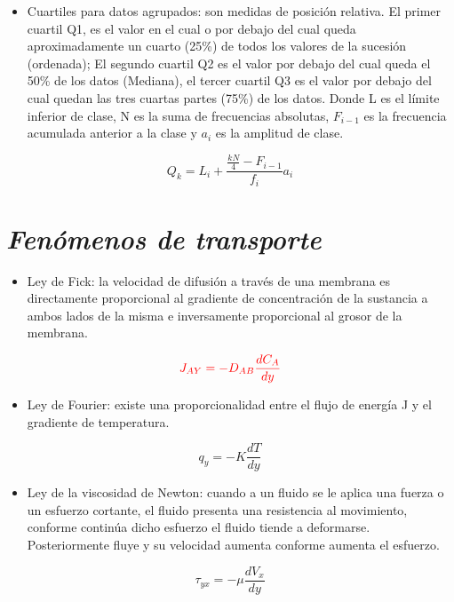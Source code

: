 \documentclass[letterpaper,12pt]{article}
\begin{document}
    \begin{itemize}
    \item [\ding{99}]
    \small{Cuartiles para datos agrupados: son medidas de posición relativa. El primer cuartil Q1, es el valor en el cual o por debajo del cual queda aproximadamente un cuarto (25\%) de todos los valores de la sucesión (ordenada); El segundo cuartil Q2 es el valor por debajo del cual queda el 50\% de los datos (Mediana), el tercer cuartil Q3 es el valor por debajo del cual quedan las tres cuartas partes (75\%) de los datos. Donde L es el límite inferior de clase, N es la suma de frecuencias absolutas, $F_{i-1}$ es la frecuencia acumulada anterior a la clase y $a_i$ es la amplitud de clase.}
    \end{itemize}
    \begin{equation*}%
    Q_k=L_i+\frac{\frac{kN}{4}-F_{i-1}}{f_i}a_i
    \end{equation*}

\section{\textit{Fenómenos de transporte}}
    \begin{itemize}
    \item [\ding{79}]
    \small{Ley de Fick: la velocidad de difusión a través de una membrana es directamente proporcional al gradiente de concentración de la sustancia a ambos lados de la misma e inversamente proporcional al grosor de la membrana.}
    \end{itemize}
    \begin{equation*}
    \textcolor{red}{J_{AY}=-D_{AB}\frac{dC_A}{dy}}
    \end{equation*}
    
    \begin{itemize}
    \item [\ding{81}]
    \small{Ley de Fourier: existe una proporcionalidad entre el flujo de energía J y el gradiente de temperatura.}
    \end{itemize}
    \begin{equation*}
    q_{y}=-K\frac{dT}{dy}
    \end{equation*}

    \begin{itemize}
    \item [\ding{82}]
    \small{Ley de la viscosidad de Newton: cuando a un fluido se le aplica una fuerza o un esfuerzo cortante, el fluido presenta una resistencia al movimiento, conforme continúa dicho esfuerzo el fluido tiende a deformarse. Posteriormente fluye y su velocidad aumenta conforme aumenta el esfuerzo.}
    \end{itemize}
    \begin{equation*}
    \tau_{yx}=-\mu \frac{dV_x}{dy}
    \end{equation*}
\end{document}

